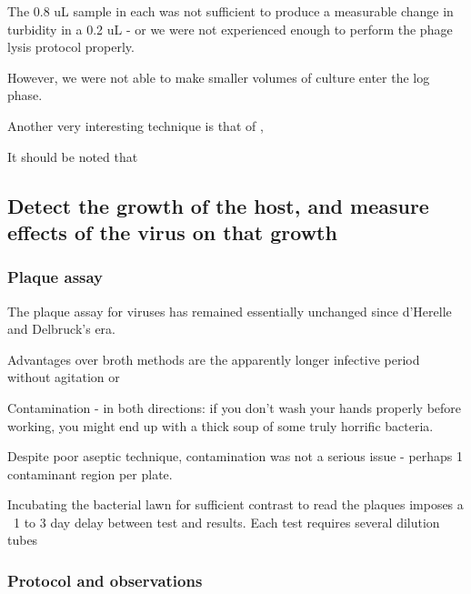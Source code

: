 \documentclass[paper.tex]{subfiles}
\begin{document}
The 0.8 uL sample in each was not sufficient to produce a measurable change in turbidity in a 0.2 uL - or we were not experienced enough to perform the phage lysis protocol properly.

However, we were not able to make smaller volumes of culture enter the log phase.




Another very interesting technique is that of \cite{Study2003}, 



























It should be noted that 

\subsection{Detect the growth of the host, and measure effects of the virus on that growth}

\subsubsection{Plaque assay}

The plaque assay for viruses has remained essentially unchanged since d'Herelle and Delbruck's era.

Advantages over broth methods are the apparently longer infective period without agitation or 

Contamination - in both directions: if you don’t wash your hands properly before working, you might end up with a thick soup of some truly horrific bacteria.

Despite poor aseptic technique, contamination was not a serious issue - perhaps 1 contaminant region per plate.

Incubating the bacterial lawn for sufficient contrast to read the plaques imposes a ~1 to 3 day delay between test and results. Each test requires several dilution tubes

\subsubsection{Protocol and observations}
\end{document}
